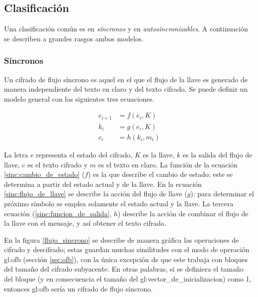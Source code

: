 %
%

\subsection{Clasificación}

Una clasificación común es en \textit{síncronos} y
en \textit{autosincronizables}. A continuación se describen a grandes rasgos
ambos modelos.

\subsubsection{Síncronos}

Un cifrado de flujo síncrono es aquel en el que el flujo de la llave es
generado de manera independiente del texto en claro y del texto cifrado. Se
puede definir un modelo general con las siguientes tres ecuaciones.

\begin{align}
  \label{sinc:cambio_de_estado}
  e_{i+1} &= f(e_i, K) \\
  \label{sinc:flujo_de_llave}
  k_i &= g(e_i, K) \\
  \label{sinc:funcion_de_salida}
  c_i &= h(k_i, m_i)
\end{align}

La letra $ e $ representa el estado del cifrado, $ K $ es la llave, $ k $ es
la salida del flujo de llave, $ c $ es el texto cifrado y $ m $ es el texto en
claro. La función de la ecuación \ref{sinc:cambio_de_estado} ($ f $) es la que
describe el cambio de estado; este se determina a partir del estado actual y
de la llave. En la ecuación \ref{sinc:flujo_de_llave} se describe la acción del
flujo de llave ($ g $): para determinar el próximo símbolo se emplea solamente
el estado actual y la llave. La tercera ecuación (\ref{sinc:funcion_de_salida},
$ h $) describe la acción de combinar el flujo de la llave con el mensaje, y
así obtener el texto cifrado.

En la figura \ref{flujo_sincrono} se describe de manera gráfica las operaciones
de cifrado y descifrado; estas guardan muchas similitudes con el modo de
operación \gls{gl:ofb} (sección \ref{sec:ofb}), con la única excepción de
que este trabaja con bloques del tamaño del cifrado subyacente. En otras
palabras, si se definiera el tamaño del bloque (y en consecuencia el tamaño del
\gls{gl:vector_de_inicializacion}) como 1, entonces \gls{gl:ofb} sería un
cifrado de flujo síncrono.

